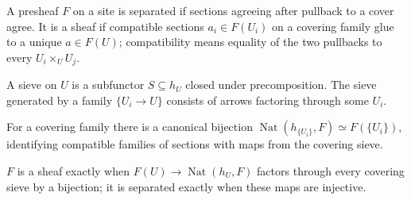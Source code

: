\begin{definition}[sheaf]\label{fga-def-2-37}
A presheaf $F$ on a site is separated if sections agreeing after pullback to a
cover agree.  It is a sheaf if compatible sections $a_i\in F(U_i)$ on a
covering family glue to a unique $a\in F(U)$; compatibility means equality of
the two pullbacks to every $U_i\times_UU_j$.
\end{definition}
\begin{definition}[sieve]\label{fga-def-2-38}
A sieve on $U$ is a subfunctor $S\subseteq h_U$ closed under precomposition.
The sieve generated by a family $\{U_i\to U\}$ consists of arrows factoring
through some $U_i$.
\end{definition}
\begin{proposition}\label{fga-prop-2-39}
For a covering family there is a canonical bijection
$\operatorname{Nat}(h_{\{U_i\}},F)\simeq F(\{U_i\})$, identifying compatible
families of sections with maps from the covering sieve.
\end{proposition}
\begin{corollary}\label{fga-cor-2-40}
$F$ is a sheaf exactly when $F(U)\to\operatorname{Nat}(h_U,F)$ factors through
every covering sieve by a bijection; it is separated exactly when these maps are
injective.
\end{corollary}

